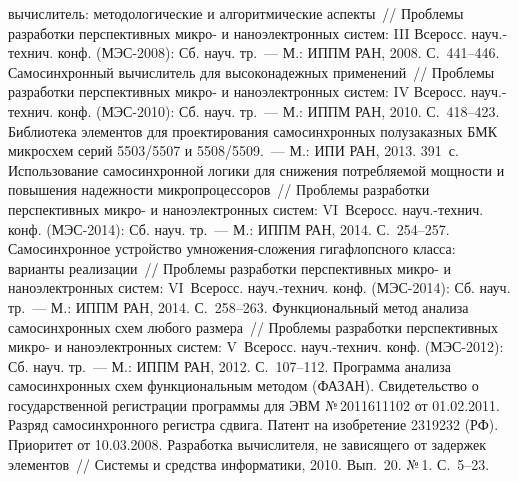 \begin{multicols}{2}
{{\begin{thebibliography}{99}
вычислитель: методологические и алгоритмические аспекты~// Проблемы разработки
перспективных микро- и наноэлектронных систем: III Всеросс. науч.-технич. конф.
 (МЭС-2008): Сб. науч. тр.~--- М.: ИППМ РАН, 2008. С.~441--446.
  Самосинхронный вычислитель для высоконадежных применений~//
Проблемы разработки перспективных микро- и наноэлектронных систем: IV Всеросс.
 науч.-технич. конф. (МЭС-2010): Сб. науч. тр.~--- М.: ИППМ РАН, 2010.
 С.~418--423.
  Библиотека элементов для
проектирования самосинхронных полузаказных БМК микросхем серий 5503/5507 и
5508/5509.~--- М.: ИПИ РАН, 2013. 391~с.
  Использова\-ние самосинхронной логики для снижения
потребляемой мощности и повышения надежности микропроцессоров~// Проблемы
разработки перспективных микро- и наноэлектронных систем: VI~Всеросс.
 науч.-технич. конф. (МЭС-2014): Сб. науч. тр.~--- М.: ИППМ РАН, 2014.
 С.~254--257.
  Самосинхронное устройство умно\-же\-ния-сло\-же\-ния
гигафлопсного класса: варианты реализации~// Проблемы разработки перспективных микро- и
наноэлектронных систем: VI~Всеросс. науч.-технич. конф. (МЭС-2014): Сб. науч.
тр.~--- М.: ИППМ РАН, 2014. С.~258--263.
  Функциональный метод анализа самосинхронных схем любого
размера~// Проблемы разработки перспективных микро- и наноэлектронных систем:
V~Всеросс. науч.-технич. конф. (МЭС-2012): Сб. науч. тр.~--- М.: ИППМ РАН, 2012.
С.~107--112.
  Программа анализа самосинхронных схем функциональным методом
(ФАЗАН). Свидетельство о государственной регистрации программы для ЭВМ
№\,2011611102 от 01.02.2011.
  Разряд самосинхронного регистра сдвига. Патент на изобретение
2319232 (РФ). Приоритет от 10.03.2008.
  Разработка вычислителя, не зависящего от задержек элементов~//
Системы и средства информатики, 2010. Вып.~20. №\,1. С.~5--23.
 \end{thebibliography}

 }
 }

\end{multicols}

